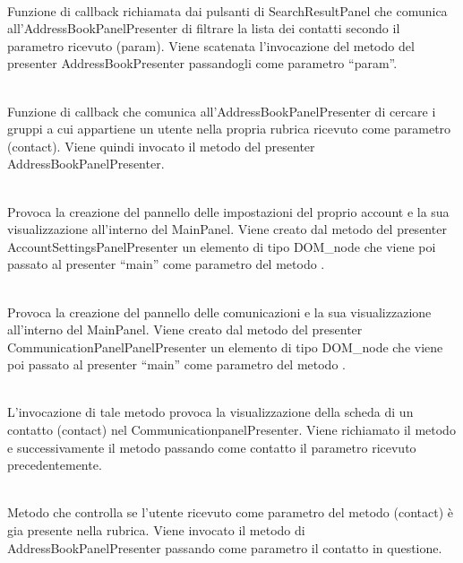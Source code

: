 \begin{description}
\item{}\\
Funzione di callback richiamata dai pulsanti di SearchResultPanel che comunica all'AddressBookPanelPresenter di filtrare la lista dei contatti secondo il parametro ricevuto (param). Viene scatenata l'invocazione del metodo  del presenter AddressBookPresenter passandogli come parametro ``param''.

\item{}\\
Funzione di callback che comunica all'AddressBookPanelPresenter di cercare i gruppi a cui appartiene un utente nella propria rubrica ricevuto come parametro (contact). Viene quindi invocato il metodo  del presenter AddressBookPanelPresenter.

\item{}\\
Provoca la creazione del pannello delle impostazioni del proprio account e la sua visualizzazione all'interno del MainPanel. Viene creato dal metodo  del presenter AccountSettingsPanelPresenter un elemento di tipo DOM\_node che viene poi passato al presenter ``main'' come parametro del metodo .


\item{}\\
Provoca la creazione del pannello delle comunicazioni e la sua visualizzazione all'interno del MainPanel. Viene creato dal metodo  del presenter CommunicationPanelPanelPresenter un elemento di tipo DOM\_node che viene poi passato al presenter ``main'' come parametro del metodo .

\item{}\\
L'invocazione di tale metodo provoca la visualizzazione della scheda di un contatto (contact) nel CommunicationpanelPresenter. Viene richiamato il metodo  e successivamente il metodo  passando come contatto il parametro ricevuto precedentemente.

\item{}\\
Metodo che controlla se l'utente ricevuto come parametro del metodo (contact) è gia presente nella rubrica. Viene invocato il metodo  di AddressBookPanelPresenter passando come parametro il contatto in questione.


\end{description}
